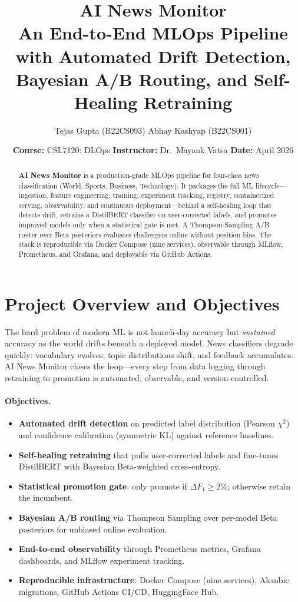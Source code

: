 \documentclass[11pt, a4paper]{article}
\title{\vspace{-1em}\textbf{AI News Monitor}\\[0.3em]
\large An End-to-End MLOps Pipeline with Automated Drift Detection, \\ Bayesian A/B Routing, and Self-Healing Retraining}
\author{Tejas Gupta (B22CS093) \quad Abhay Kashyap (B22CS001)}
\date{\textbf{Course:} CSL7120: DLOps \quad \textbf{Instructor:} Dr.\ Mayank Vatsa \quad \textbf{Date:} April 2026}
\begin{document}
\maketitle

\begin{abstract}\noindent
\small
\textbf{AI News Monitor} is a production-grade MLOps pipeline for four-class news classification (World, Sports, Business, Technology). It packages the full ML lifecycle---ingestion, feature engineering, training, experiment tracking, registry, containerized serving, observability, and continuous deployment---behind a self-healing loop that detects drift, retrains a DistilBERT classifier on user-corrected labels, and promotes improved models only when a statistical gate is met. A Thompson-Sampling A/B router over Beta posteriors evaluates challengers online without position bias. The stack is reproducible via Docker Compose (nine services), observable through MLflow, Prometheus, and Grafana, and deployable via GitHub Actions.
\end{abstract}

\vspace{-0.5em}

\section{Project Overview and Objectives}

The hard problem of modern ML is not launch-day accuracy but \emph{sustained} accuracy as the world drifts beneath a deployed model. News classifiers degrade quickly: vocabulary evolves, topic distributions shift, and feedback accumulates. AI News Monitor closes the loop---every step from data logging through retraining to promotion is automated, observable, and version-controlled.

\paragraph{Objectives.}
\begin{itemize}
    \item \textbf{Automated drift detection} on predicted label distribution (Pearson $\chi^2$) and confidence calibration (symmetric KL) against reference baselines.
    \item \textbf{Self-healing retraining} that pulls user-corrected labels and fine-tunes DistilBERT with Bayesian Beta-weighted cross-entropy.
    \item \textbf{Statistical promotion gate}: only promote if $\Delta F_1 \geq 2\%$; otherwise retain the incumbent.
    \item \textbf{Bayesian A/B routing} via Thompson Sampling over per-model Beta posteriors for unbiased online evaluation.
    \item \textbf{End-to-end observability} through Prometheus metrics, Grafana dashboards, and MLflow experiment tracking.
    \item \textbf{Reproducible infrastructure}: Docker Compose (nine services), Alembic migrations, GitHub Actions CI/CD, HuggingFace Hub.
\end{itemize}
\end{document}
